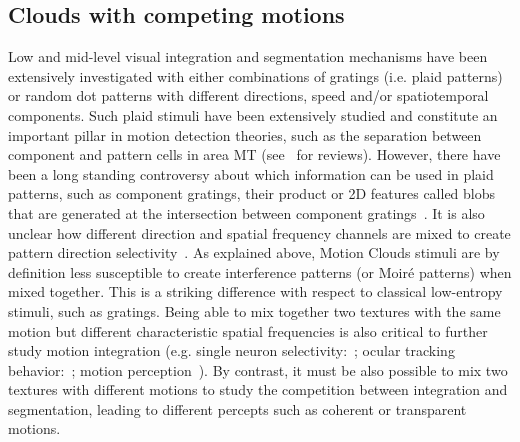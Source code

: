 \documentclass[a4paper,11pt]{article}%
\begin{document}
\subsection{Clouds with competing motions}%
Low and mid-level visual integration and segmentation mechanisms have been extensively investigated with either combinations of gratings (i.e. plaid patterns) or random dot patterns with different directions, speed and/or spatiotemporal components. Such plaid stimuli have been extensively studied and constitute an important pillar in motion detection theories, such as the separation between component and pattern cells in area MT (see~\citep{Movshon85,Burr11,Bradley05} for reviews). However, there have been a long standing controversy about which information can be used in plaid patterns, such as component gratings, their product or 2D features called blobs that are generated at the intersection between component gratings~\citep{Derrington04}. It is also unclear how different direction and spatial frequency channels are mixed to create pattern direction selectivity~\citep{Rust06}. As explained above, Motion Clouds stimuli are by definition less susceptible to create interference patterns (or Moir{\'e} patterns) when mixed together. This is a striking difference with respect to classical low-entropy stimuli, such as gratings. Being able to mix together two textures with the same motion but different characteristic spatial frequencies is also critical to further study motion integration (e.g. single neuron selectivity:~\citep{Rust05}; ocular tracking behavior:~\citep{Masson02}; motion perception~\citep{smith90}). By contrast, it must be also possible to mix two textures with different motions to study the competition between integration and segmentation, leading to different percepts such as coherent or transparent motions. %
\end{document}
